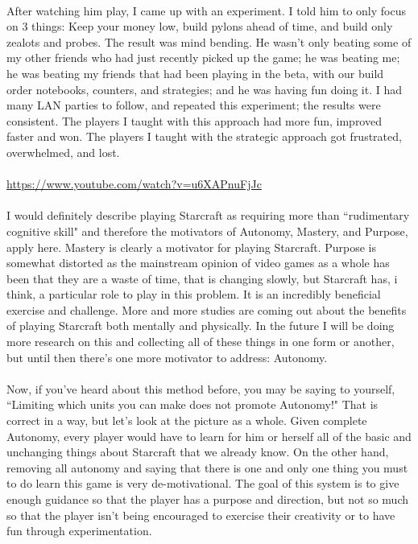 \documentclass{article}
\begin{document}
\paragraph{}
After watching him play, I came up with an experiment. I told him to only
focus on 3 things: Keep your money low, build pylons ahead of time, and build
only zealots and probes. The result was mind bending. He wasn’t only beating
some of my other friends who had just recently picked up the game; he was
beating me; he was beating my friends that had been playing in the beta, with
our build order notebooks, counters, and strategies; and he was having fun
doing it. I had many LAN parties to follow, and repeated this experiment; the
results were consistent. The players I taught with this approach had more fun,
improved faster and won. The players I taught with the strategic approach got
frustrated, overwhelmed, and lost.

\paragraph{}
\url{https://www.youtube.com/watch?v=u6XAPnuFjJc}

\paragraph{}
I would definitely describe playing Starcraft as requiring more than
``rudimentary cognitive skill" and therefore the motivators of Autonomy,
Mastery, and Purpose, apply here. Mastery is clearly a motivator for playing
Starcraft. Purpose is somewhat distorted as the mainstream opinion of video
games as a whole has been that they are a waste of time, that is changing
slowly, but Starcraft has, i think, a particular role to play in this problem.
It is an incredibly beneficial exercise and challenge. More and more studies
are coming out about the benefits of playing Starcraft both mentally and
physically. In the future I will be doing more research on this and collecting
all of these things in one form or another, but until then there's one more
motivator to address: Autonomy.

\paragraph{}
Now, if you've heard about this method before, you may be saying to yourself,
``Limiting which units you can make does not promote Autonomy!" That is correct
in a way, but let's look at the picture as a whole. Given complete Autonomy,
every player would have to learn for him or herself all of the basic and
unchanging things about Starcraft that we already know. On the other hand,
removing all autonomy and saying that there is one and only one thing you must
to do learn this game is very de-motivational. The goal of this system is to
give enough guidance so that the player has a purpose and direction, but not
so much so that the player isn't being encouraged to exercise their creativity
or to have fun through experimentation.
\end{document}
